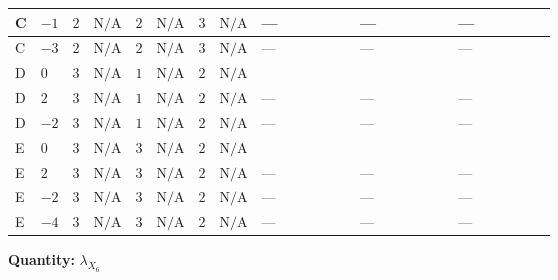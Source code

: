 \documentclass[8pt]{article}
\begin{document}
\begin{landscape}
\begin{longtable}{@{}llcccccc >{\raggedright\arraybackslash}p{0.21\linewidth} >{\raggedright\arraybackslash}p{0.21\linewidth} >{\raggedright\arraybackslash}p{0.21\linewidth}@{}}
\midrule
C & $-1$ & $2$ & $\text{N/A}$ & $2$ & $\text{N/A}$ & $3$ & $\text{N/A}$ & --- & --- & --- \\
\midrule
C & $-3$ & $2$ & $\text{N/A}$ & $2$ & $\text{N/A}$ & $3$ & $\text{N/A}$ & --- & --- & --- \\
\midrule
D & $0$ & $3$ & $\text{N/A}$ & $1$ & $\text{N/A}$ & $2$ & $\text{N/A}$ & \scriptsize\adjustbox{max width=\linewidth}{$\begin{gathered} +2 {\lambda_{X_{18}}}^2\end{gathered}$} & \scriptsize\adjustbox{max width=\linewidth}{$\begin{gathered} -24 {g_2}^2 {\lambda_{X_{6}}}\end{gathered}$} & \scriptsize\adjustbox{max width=\linewidth}{$\begin{gathered} -8 {\lambda_{S_1}^{(A)}} {\lambda_{X_{6}}}\end{gathered}$} \\
\midrule
D & $2$ & $3$ & $\text{N/A}$ & $1$ & $\text{N/A}$ & $2$ & $\text{N/A}$ & --- & --- & --- \\
\midrule
D & $-2$ & $3$ & $\text{N/A}$ & $1$ & $\text{N/A}$ & $2$ & $\text{N/A}$ & --- & --- & --- \\
\midrule
E & $0$ & $3$ & $\text{N/A}$ & $3$ & $\text{N/A}$ & $2$ & $\text{N/A}$ & \scriptsize\adjustbox{max width=\linewidth}{$\begin{gathered} +2 {\lambda_{X_{18}}}^2\end{gathered}$} & \scriptsize\adjustbox{max width=\linewidth}{$\begin{gathered} -24 {g_2}^2 {\lambda_{X_{6}}}\end{gathered}$} & \scriptsize\adjustbox{max width=\linewidth}{$\begin{gathered} -8 {\lambda_{S_1}^{(A)}} {\lambda_{X_{6}}}\end{gathered}$} \\
\midrule
E & $2$ & $3$ & $\text{N/A}$ & $3$ & $\text{N/A}$ & $2$ & $\text{N/A}$ & --- & --- & --- \\
\midrule
E & $-2$ & $3$ & $\text{N/A}$ & $3$ & $\text{N/A}$ & $2$ & $\text{N/A}$ & --- & --- & --- \\
\midrule
E & $-4$ & $3$ & $\text{N/A}$ & $3$ & $\text{N/A}$ & $2$ & $\text{N/A}$ & --- & --- & --- \\
\midrule
\bottomrule
\end{longtable}
\clearpage
\noindent\textbf{Quantity: }${\lambda_{X_{6}}}$\par\smallskip

\end{landscape}
\end{document}
